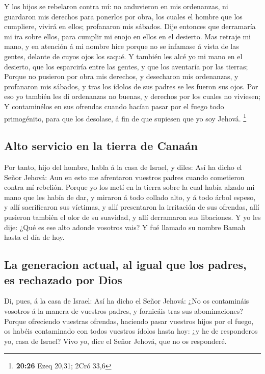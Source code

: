  Y los hijos se rebelaron contra mí: no anduvieron en mis
ordenanzas, ni guardaron mis derechos para ponerlos por obra, los cuales
el hombre que los cumpliere, vivirá en ellos; profanaron mis sábados.
Dije entonces que derramaría mi ira sobre ellos, para cumplir mi enojo
en ellos en el desierto.  Mas retraje mi mano, y en
atención á mi nombre hice porque no se infamase á vista de las gentes,
delante de cuyos ojos los saqué.  Y también les alcé yo
mi mano en el desierto, que los esparciría entre las gentes, y que los
aventaría por las tierras;  Porque no pusieron por obra
mis derechos, y desecharon mis ordenanzas, y profanaron mis sábados, y
tras los ídolos de sus padres se les fueron sus ojos. 
Por eso yo también les dí ordenanzas no buenas, y derechos por los
cuales no viviesen;  Y contaminélos en sus ofrendas
cuando hacían pasar por el fuego todo primogénito, para que los
desolase, á fin de que supiesen que yo soy Jehová. \footnote{\textbf{20:26}
  Ezeq 20,31; 2Cró 33,6}

\hypertarget{alto-servicio-en-la-tierra-de-canauxe1n}{%
\subsection{Alto servicio en la tierra de
Canaán}\label{alto-servicio-en-la-tierra-de-canauxe1n}}

 Por tanto, hijo del hombre, habla á la casa de Israel, y
diles: Así ha dicho el Señor Jehová: Aun en esto me afrentaron vuestros
padres cuando cometieron contra mí rebelión.  Porque yo
los metí en la tierra sobre la cual había alzado mi mano que les había
de dar, y miraron á todo collado alto, y á todo árbol espeso, y allí
sacrificaron sus víctimas, y allí presentaron la irritación de sus
ofrendas, allí pusieron también el olor de su suavidad, y allí
derramaron sus libaciones.  Y yo les dije: ¿Qué es ese
alto adonde vosotros vais? Y fué llamado su nombre Bamah hasta el día de
hoy.

\hypertarget{la-generacion-actual-al-igual-que-los-padres-es-rechazado-por-dios}{%
\subsection{La generacion actual, al igual que los padres, es rechazado
por
Dios}\label{la-generacion-actual-al-igual-que-los-padres-es-rechazado-por-dios}}

 Di, pues, á la casa de Israel: Así ha dicho el Señor
Jehová: ¿No os contamináis vosotros á la manera de vuestros padres, y
fornicáis tras sus abominaciones?  Porque ofreciendo
vuestras ofrendas, haciendo pasar vuestros hijos por el fuego, os habéis
contaminado con todos vuestros ídolos hasta hoy: ¿y he de responderos
yo, casa de Israel? Vivo yo, dice el Señor Jehová, que no os responderé.

